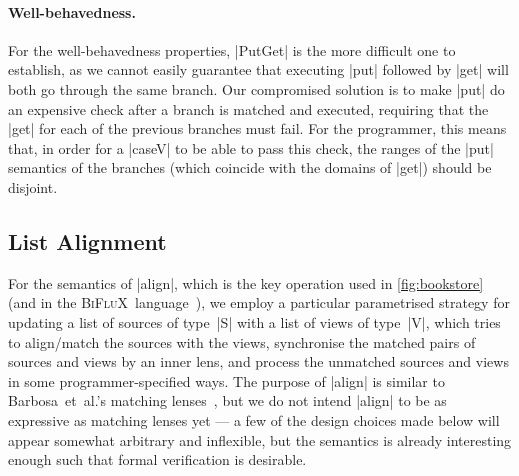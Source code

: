 \documentclass{sigplanconf}
\newcommand{\BiFluX}{\textsc{BiFluX}}
\begin{document}
\paragraph{Well-behavedness.}
For the well-behavedness properties, |PutGet| is the more difficult one to establish, as we cannot easily guarantee that executing |put| followed by |get| will both go through the same branch.
Our compromised solution is to make |put| do an expensive check after a branch is matched and executed, requiring that the |get| for each of the previous branches must fail.
For the programmer, this means that, in order for a |caseV| to be able to pass this check, the ranges of the |put| semantics of the branches (which coincide with the domains of |get|) should be disjoint.

\subsection{List Alignment}
\label{sec:list-alignment}

For the semantics of |align|, which is the key operation used in \autoref{fig:bookstore} (and in the \BiFluX\ language~\cite{Pacheco-BiFluX}), we employ a particular parametrised strategy for updating a list of sources of type~|S| with a list of views of type~|V|, which tries to align/match the sources with the views, synchronise the matched pairs of sources and views by an inner lens, and process the unmatched sources and views in some programmer-specified ways.
The purpose of |align| is similar to Barbosa~et~al.'s matching lenses~\cite{Barbosa:2010}, but we do not intend |align| to be as expressive as matching lenses yet --- a few of the design choices made below will appear somewhat arbitrary and inflexible, but the semantics is already interesting enough such that formal verification is desirable.
\end{document}
